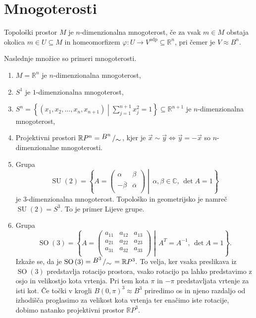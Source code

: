 % 


\section{Mnogoterosti}%

\begin{definicija}
\label{def_mnt}
Topološki prostor $M$
je $n$-dimenzionalna mnogoterost, če za vsak $m \in M$
obstaja okolica $m \in U \subseteq M$ in homeomorfizem
$\varphi : U \to V^{\text{odp}} \subseteq
\mathbb{R}^n$, pri čemer je $V \approx B^{n}$.
\end{definicija}


\begin{primer}
Naslednje množice so primeri mnogoterosti.
\begin{enumerate}
	\item $M = \mathbb{R}^n$ je
$n$-dimenzionalna mnogoterost,
	\item $S^1$ je
$1$-dimenzionalna mnogoterost,
  \item $S^{n} =
\left\{\left( x_1, x_2, \ldots, x_n, x_{n+1}
\right) \middle| \sum_{j=1}^{n+1} x_{j}^2 =
1\right\} \subseteq \mathbb{R}^{n+1}$ je
$n$-dimenzionalna mnogoterost,
	\item Projektivni
prostori $\mathbb{R}P^{n} = \bigslant{B^{n}}{\sim} $,
kjer je $\vec{x} \sim \vec{y}  \iff \vec{y}  =
-\vec{x}$ so $n$-dimenzionalne mnogoterosti.
	\item Grupa \begin{equation*} \operatorname{SU}\left( 2 \right) = \left\{ A
= \begin{pmatrix}
\alpha & \beta \\ -
\overline{\beta}  & \overline{\alpha}  \\
\end{pmatrix}
\middle|\, \alpha, \beta \in  \mathbb{C}, \, \det
A = 1 \right\} 	\end{equation*}je $3$-dimenzionalna mnogoterost. Topološko in
geometrijsko je namreč $\operatorname{SU}\left( 2 \right) = S^3.$ To
je primer Lijeve grupe.
	\item Grupa \begin{equation*}
\operatorname{SO}\left( 3 \right) =
\left\{ A =
\begin{pmatrix} a_{11} &
a_{12} & a_{13} \\ a_{21} & a_{22}
& a_{23} \\ a_{31} & a_{32}
& a_{33} \\
\end{pmatrix}
\middle|\, A^{T} = A^{-1}, \, \det  A
= 1 \right\}. \end{equation*} Izkaže se, da je
$\operatorname{SO}\left( 3\right ) =
\bigslant{B^3}{\sim } = \mathbb{R}P^3.$ To
velja, ker vsaka preslikava iz
$\operatorname{SO}\left( 3\right )$
predstavlja rotacijo prostora, vsako
rotacijo pa lahko predstavimo z osjo in
velikostjo kota vrtenja. Pri tem kota $\pi$
in $-\pi$ predstavljata vrtenje za isti
kot. Če točki v krogli $B\left( 0, \pi
\right)^{3} \approx B^3$ priredimo os in njeno
razdaljo od izhodišča proglasimo za velikost kota vrtenja
ter enačimo iste rotacije, dobimo natanko projektivni prostor
$\mathbb{R}P^3$.
\end{enumerate}
\end{primer}

